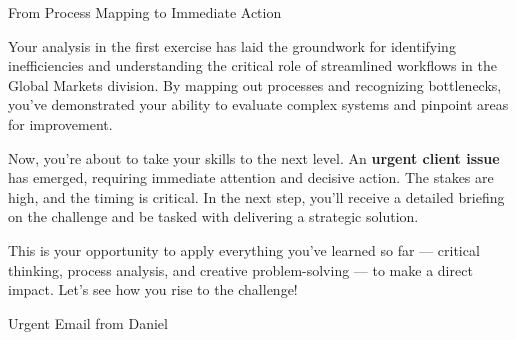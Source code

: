 \documentclass[11pt]{article}
\begin{document}
\newpage
{\fontsize{26}{30}\selectfont From Process Mapping to Immediate Action}\par\bigskip

Your analysis in the first exercise has laid the groundwork for identifying
inefficiencies and understanding the critical role of streamlined workflows in
the Global Markets division. By mapping out processes and recognizing
bottlenecks, you've demonstrated your ability to evaluate complex systems and
pinpoint areas for improvement.

Now, you're about to take your skills to the next level. An \textbf{urgent
client issue} has emerged, requiring immediate attention and decisive action.
The stakes are high, and the timing is critical. In the next step, you'll
receive a detailed briefing on the challenge and be tasked with delivering a
strategic solution.

This is your opportunity to apply everything you've learned so far ---
critical thinking, process analysis, and creative problem-solving --- to make a
direct impact. Let's see how you rise to the challenge!

\newpage
{\fontsize{26}{30}\selectfont Urgent Email from Daniel}\par\bigskip
\end{document}
